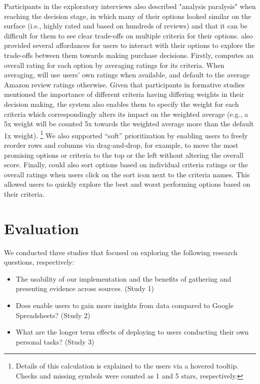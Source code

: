 Participants in the exploratory interviews also described "analysis paralysis" when reaching the decision stage, in which many of their options looked similar on the surface (i.e., highly rated and based on hundreds of reviews) and that it can be difficult for them to see clear trade-offs on multiple criteria for their options. \SYSTEM also provided several affordances for users to interact with their options to explore the trade-offs between them towards making purchase decisions. Firstly, \SYSTEM computes an overall rating for each option by averaging ratings for its criteria. When averaging, \SYSTEM will use users’ own ratings when available, and default to the average Amazon review ratings otherwise. Given that participants in formative studies mentioned the importance of different criteria having differing weights in their decision making, the system also enables them to specify the weight for each criteria which correspondingly alters its impact on the weighted average (e.g., a 5x weight will be counted 5x towards the weighted average more than the default 1x weight). \footnote{Details of this calculation is explained to the users via a hovered tooltip. Checks and missing symbols were counted as 1 and 5 stars, respectively.} We also supported ``soft'' prioritization by enabling users to freely reorder rows and columns via drag-and-drop, for example, to move the most promising options or criteria to the top or the left without altering the overall score. Finally, \SYSTEM could also sort options based on individual criteria ratings or the overall ratings when users click on the sort icon next to the criteria names. This allowed users to quickly explore the best and worst performing options based on their criteria. 


\section{Evaluation}

We conducted three studies that focused on exploring the following research questions, respectively:

\begin{itemize}
  \setlength\itemsep{0em}

\item The usability of our implementation and the benefits of gathering and presenting evidence across sources. (Study 1)

\item Does \SYSTEM enable users to gain more insights from data compared to Google Spreadsheets? (Study 2)

\item What are the longer term effects of deploying \SYSTEM to users conducting their own personal tasks? (Study 3)
\end{itemize}

